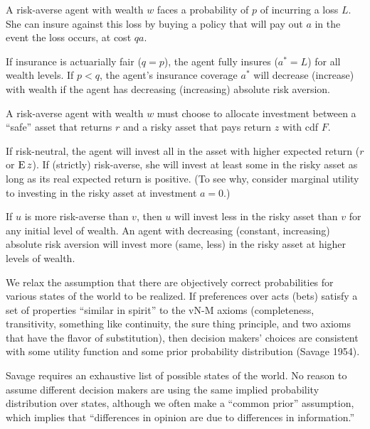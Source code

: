 \documentclass[8pt,letterpaper, landscape]{extarticle} %
\begin{document}
\begin{multicols}{3}
\begin{description}
 A risk-averse agent with wealth $ w $ faces a probability of $ p $ of incurring a loss $ L $. She can insure against this loss by buying a policy that will pay out $ a $ in the event the loss occurs, at cost $ qa $.

If insurance is actuarially fair ($ q = p $), the agent fully insures ($ a^* = L $) for all wealth levels. If $ p<q $, the agent's insurance coverage $ a^* $ will decrease (increase) with wealth if the agent has decreasing (increasing) absolute risk aversion.

 A risk-averse agent with wealth $ w $ must choose to allocate investment between a ``safe'' asset that returns $ r $ and a risky asset that pays return $ z $ with cdf $ F $.

If risk-neutral, the agent will invest all in the asset with higher expected return ($ r $ or $ \operatorname{E} z $). If (strictly) risk-averse, she will invest at least some in the risky asset as long as its real expected return is positive. (To see why, consider marginal utility to investing in the risky asset at investment $ a = 0 $.)

If $ u $ is more risk-averse than $ v $, then $ u $ will invest less in the risky asset than $ v $ for any initial level of wealth. An agent with decreasing (constant, increasing) absolute risk aversion will invest more (same, less) in the risky asset at higher levels of wealth.

 We relax the assumption that there are objectively correct probabilities for various states of the world to be realized. If preferences over acts (bets) satisfy a set of properties ``similar in spirit'' to the vN-M axioms (completeness, transitivity, something like continuity, the sure thing principle, and two axioms that have the flavor of substitution), then decision makers' choices are consistent with some utility function and some prior probability distribution (Savage 1954).

Savage requires an exhaustive list of possible states of the world. No reason to assume different decision makers are using the same implied probability distribution over states, although we often make a ``common prior'' assumption, which implies that ``differences in opinion are due to differences in information.''


\end{description}
\end{multicols}
\end{document}
